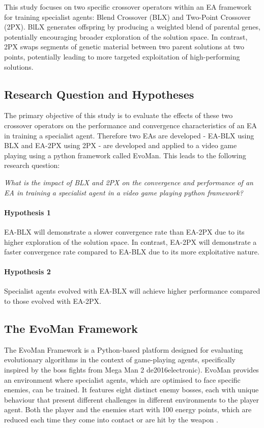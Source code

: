 This study focuses on two specific crossover operators within an EA framework for training specialist agents: Blend Crossover (BLX) and Two-Point Crossover (2PX). BlLX generates offspring by producing a weighted blend of parental genes, potentially encouraging broader exploration of the solution space.
In contrast, 2PX swaps segments of genetic material between two parent solutions at two points, potentially leading to more targeted exploitation of high-performing solutions.

\subsection{Research Question and Hypotheses}
The primary objective of this study is to evaluate the effects of these two crossover operators on the performance and convergence characteristics of an EA in training a specialist agent.
Therefore two EAs are developed - EA-BLX using BLX and EA-2PX using 2PX - are developed and applied to a video game playing using a python framework called EvoMan.
This leads to the following research question:

\textit{What is the impact of BLX and 2PX on the convergence and performance of an EA in training a specialist agent in a video game playing python framework?}

\paragraph{Hypothesis 1}
EA-BLX will demonstrate a slower convergence rate than EA-2PX due to its higher exploration of the solution space.
In contrast, EA-2PX will demonstrate a faster convergence rate compared to EA-BLX due to its more exploitative nature.
\paragraph{Hypothesis 2}
Specialist agents evolved with EA-BLX will achieve higher performance compared to those evolved with EA-2PX.

\subsection{The EvoMan Framework}
The EvoMan Framework is a Python-based platform designed for evaluating evolutionary algorithms in the context of game-playing agents, specifically inspired by the boss fights from Mega Man 2 de2016electronic).
EvoMan provides an environment where specialist agents, which are optimised to face specific enemies, can be trained.
It features eight distinct enemy bosses, each with unique behaviour that present different challenges in different environments to the player agent.
Both the player and the enemies start with 100 energy points, which are reduced each time they come into contact or are hit by the weapon \cite{2016evoman}.


